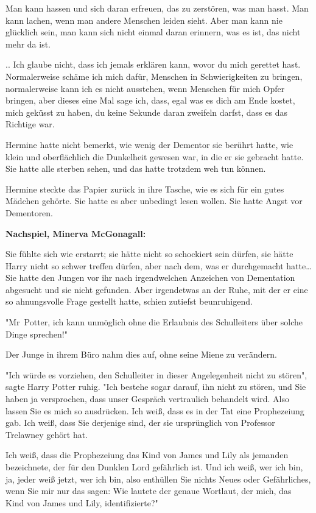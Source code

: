 {{Man kann hassen und sich daran erfreuen, das zu zerstören, was man hasst. Man kann lachen, wenn man andere Menschen leiden sieht. Aber man kann nie glücklich sein, man kann sich nicht einmal daran erinnern, was es ist, das nicht mehr da ist.

.. Ich glaube nicht, dass ich jemals erklären kann, wovor du mich gerettet hast. Normalerweise schäme ich mich dafür, Menschen in Schwierigkeiten zu bringen, normalerweise kann ich es nicht ausstehen, wenn Menschen für mich Opfer bringen, aber dieses eine Mal sage ich, dass, egal was es dich am Ende kostet, mich geküsst zu haben, du keine Sekunde daran zweifeln darfst, dass es das Richtige war.}

Hermine hatte nicht bemerkt, wie wenig der Dementor sie berührt hatte, wie klein und oberflächlich die Dunkelheit gewesen war, in die er sie gebracht hatte. Sie hatte alle sterben sehen, und das hatte trotzdem weh tun können.

Hermine steckte das Papier zurück in ihre Tasche, wie es sich für ein gutes Mädchen gehörte. Sie hatte es aber unbedingt lesen wollen. Sie hatte Angst vor Dementoren.

\textbf{Nachspiel, Minerva McGonagall:}

Sie fühlte sich wie erstarrt; sie hätte nicht so schockiert sein dürfen, sie hätte Harry nicht so schwer treffen dürfen, aber nach dem, was er durchgemacht hatte… Sie hatte den Jungen vor ihr nach irgendwelchen Anzeichen von Dementation abgesucht und sie nicht gefunden. Aber irgendetwas an der Ruhe, mit der er eine so ahnungsvolle Frage gestellt hatte, schien zutiefst beunruhigend.

"Mr~Potter, ich kann unmöglich ohne die Erlaubnis des Schulleiters über solche Dinge sprechen!"

Der Junge in ihrem Büro nahm dies auf, ohne seine Miene zu verändern.

"Ich würde es vorziehen, den Schulleiter in dieser Angelegenheit nicht zu stören", sagte Harry Potter ruhig. "Ich bestehe sogar darauf, ihn nicht zu stören, und Sie haben ja versprochen, dass unser Gespräch vertraulich behandelt wird. Also lassen Sie es mich so ausdrücken. Ich weiß, dass es in der Tat eine Prophezeiung gab. Ich weiß, dass Sie derjenige sind, der sie ursprünglich von Professor Trelawney gehört hat.

Ich weiß, dass die Prophezeiung das Kind von James und Lily als jemanden bezeichnete, der für den Dunklen Lord gefährlich ist. Und ich weiß, wer ich bin, ja, jeder weiß jetzt, wer ich bin, also enthüllen Sie nichts Neues oder Gefährliches, wenn Sie mir nur das sagen: Wie lautete der genaue Wortlaut, der mich, das Kind von James und Lily, identifizierte?"

}
